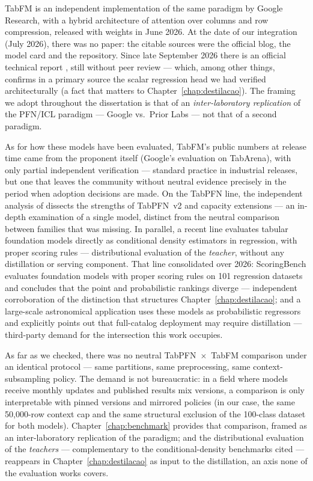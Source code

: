 TabFM \citep{tabfm2026} is an independent implementation of the same
paradigm by Google Research, with a hybrid architecture of attention
over columns and row compression, released with weights in June
2026. At the date of our integration (July 2026), there was no
paper: the citable sources were the official blog, the model card
and the repository. Since late September 2026 there is an official
technical report \citep{kong2026}, still without peer review ---
which, among other things, confirms in a primary source the scalar
regression head we had verified architecturally (a fact that matters
to Chapter~\ref{chap:destilacao}). The framing we adopt throughout
the dissertation is that of an \emph{inter-laboratory replication}
of the PFN/ICL paradigm --- Google vs.\ Prior Labs --- not that of a
second paradigm.

As for how these models have been evaluated, TabFM's public numbers
at release time came from the proponent itself (Google's evaluation
on TabArena), with only partial independent verification ---
standard practice in industrial releases, but one that leaves the
community without neutral evidence precisely in the period when
adoption decisions are made. On the TabPFN line, the independent
analysis of \citet{ye2025tabpfnv2} dissects the strengths of
TabPFN~v2 and capacity extensions --- an in-depth examination of a
single model, distinct from the neutral comparison between families
that was missing. In parallel, a recent line evaluates tabular
foundation models directly as conditional density estimators in
regression, with proper scoring rules
\citep{izbicki2026,landsgesell2026} --- distributional evaluation of
the \emph{teacher}, without any distillation or serving component.
That line consolidated over 2026: ScoringBench
\citep{scoringbench2026} evaluates foundation models with proper
scoring rules on 101 regression datasets and concludes that the
point and probabilistic rankings diverge --- independent
corroboration of the distinction that structures
Chapter~\ref{chap:destilacao}; and a large-scale astronomical
application \citep{photoz2026} uses these models as probabilistic
regressors and explicitly points out that full-catalog deployment
may require distillation --- third-party demand for the
intersection this work occupies.

As far as we checked, there was no neutral TabPFN~$\times$~TabFM
comparison under an identical protocol --- same partitions, same
preprocessing, same context-subsampling policy. The demand is not
bureaucratic: in a field where models receive monthly updates and
published results mix versions, a comparison is only interpretable
with pinned versions and mirrored policies (in our case, the same
50{,}000-row context cap and the same structural exclusion of
the 100-class dataset for both models).
Chapter~\ref{chap:benchmark} provides that comparison, framed as an
inter-laboratory replication of the paradigm; and the
distributional evaluation of the \emph{teachers} --- complementary
to the conditional-density benchmarks cited --- reappears in
Chapter~\ref{chap:destilacao} as input to the distillation, an axis
none of the evaluation works covers.

